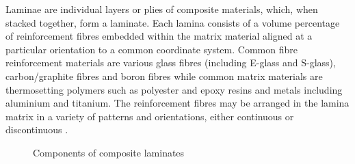 Laminae are individual layers or plies of composite materials, which, when stacked together, form a laminate. Each lamina consists of a volume percentage of reinforcement fibres embedded within the matrix material aligned at a particular orientation to a common coordinate system. Common fibre reinforcement materials are various glass fibres (including E-glass and S-glass), carbon/graphite fibres and boron fibres while common matrix materials are thermosetting polymers such as polyester and epoxy resins and metals including aluminium and titanium. The reinforcement fibres may be arranged in the lamina matrix in a variety of patterns and orientations, either continuous or discontinuous \cite{agarwal2006analysis}. 
\begin{figure}[H]
	\caption{\label{composite_laminates}Components of composite laminates \cite{reddy2004mechanics}}
\end{figure}

